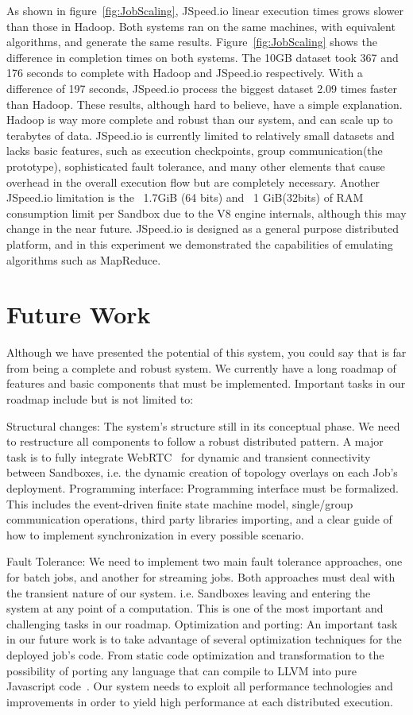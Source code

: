 \documentclass[10pt,reprint]{socc14}
\begin{document}
As shown in figure~\ref{fig:JobScaling}, JSpeed.io linear execution times grows slower than those in Hadoop. Both systems ran on the same machines, with equivalent algorithms, and generate the same results. Figure~\ref{fig:JobScaling} shows the difference in completion times on both systems. The 10GB dataset took 367 and 176 seconds to complete with Hadoop and JSpeed.io respectively. With a difference of 197 seconds, JSpeed.io process the biggest dataset 2.09 times faster than Hadoop. These results, although hard to believe, have a simple explanation. Hadoop is way more complete and robust than our system, and can scale up to terabytes of data. JSpeed.io is currently limited to relatively small datasets and lacks basic features, such as execution checkpoints, group communication(the prototype), sophisticated fault tolerance, and many other elements that cause overhead in the overall execution flow but are completely necessary. Another JSpeed.io limitation is the  ~1.7GiB (64 bits) and ~1 GiB(32bits) of RAM consumption limit per Sandbox due to the V8 engine internals, although this may change in the near future.  JSpeed.io is designed as a general purpose distributed platform, and in this experiment we demonstrated the capabilities of emulating algorithms such as MapReduce.


\section{Future Work}

Although we have presented the potential of this system, you could say that is far from being a complete and robust system. We currently have a long roadmap of features and basic components that must be implemented. Important tasks in our roadmap include but is not limited to:

Structural changes: The system's structure still in its conceptual phase. We need to restructure all components to follow a robust distributed pattern. A major task is to fully integrate WebRTC~\cite{Vogt2013} for dynamic and transient connectivity between Sandboxes, i.e. the dynamic creation of topology overlays on each Job’s deployment.
Programming interface: Programming interface must be formalized. This includes the event-driven finite state machine model, single/group communication operations, third party libraries importing, and a clear guide of how to implement synchronization in every possible scenario.

Fault Tolerance: We need to implement two main fault tolerance approaches, one for batch jobs, and another for  streaming jobs. Both approaches must deal with the transient nature of our system. i.e. Sandboxes leaving and entering the system at any point of a computation. This is one of the most important and challenging tasks in our roadmap.
Optimization and porting: An important task in our future work is to take advantage of several optimization techniques for the deployed job’s code. From static code optimization and transformation to the possibility of porting any language that can compile to  LLVM into pure Javascript code~\cite{Zakai2011}. Our system needs to exploit all performance technologies and improvements in order to yield high performance at each distributed execution.
\end{document}
